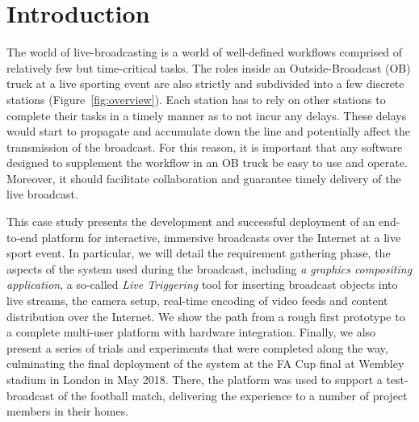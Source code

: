 \documentclass[sigchi-a, authorversion]{acmart}
\begin{document}
\maketitle

\section{Introduction}

 The world of live-broadcasting is a world of well-defined workflows comprised
 of relatively few but time-critical tasks. The roles inside an Outside-Broadcast
 (OB) truck at a live sporting event are also strictly and subdivided into a few
 discrete stations (Figure~\ref{fig:overview}). Each station has to rely on other
 stations to complete their tasks in a timely manner as to not incur any delays.
 These delays would start to propagate and accumulate down the line and
 potentially affect the transmission of the broadcast. For this reason, it is
 important that any software designed to supplement the workflow in an OB truck
 be easy to use and operate. Moreover, it should facilitate collaboration and
 guarantee timely delivery of the live broadcast.

 This case study presents the development and successful deployment of an
 end-to-end platform for interactive, immersive broadcasts over the Internet at
 a live sport event. In particular, we will detail the requirement gathering phase,
 the aspects of the system used during the broadcast, including \emph{a graphics compositing
 application}, a so-called \emph{Live Triggering} tool for inserting broadcast objects
 into live streams, the camera setup, real-time encoding of video feeds and content
 distribution over the Internet.
 We show the path from a rough first prototype to a complete multi-user platform
 with hardware integration. Finally, we also present a series of trials and
 experiments that were completed along the way, culminating the final
 deployment of the system at the FA Cup final at Wembley stadium in London in
 May 2018. There, the platform was used to support a test-broadcast of the
 football match, delivering the experience to a number of project members in
 their homes.
\end{document}
